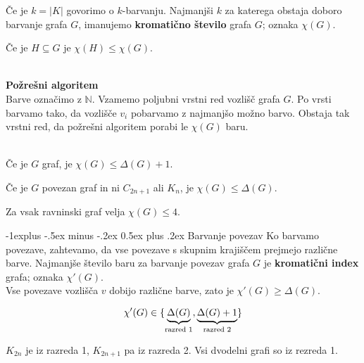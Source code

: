 \documentclass[a4paper,8pt]{extarticle}
\makeatletter
\renewcommand{\subsection}{\@startsection{subsection}{2}{0mm}%
                                {-1explus -.5ex minus -.2ex}%
                                {0.5ex plus .2ex}%
                                {\normalfont\normalsize\bfseries}}
\makeatother
\begin{document}
\begin{multicols}{4}
Če je $k = |K|$ govorimo o $k$-barvanju. Najmanjši $k$ za katerega obstaja doboro barvanje grafa $G$, imanujemo
\textbf{kromatično število} grafa $G$; oznaka $\chi(G)$.

Če je $H \subseteq G$ je $\chi(H) \leq \chi(G)$.\\\

\textbf{Požrešni algoritem}\\
Barve označimo z $\mathbb{N}$. Vzamemo poljubni vrstni red vozlišč grafa $G$. Po vrsti barvamo tako, da 
vozlišče $v_i$ pobarvamo z najmanjšo možno barvo.
Obstaja tak vrstni red, da požrešni algoritem porabi le $\chi(G)$ baru.\\\

Če je $G$ graf, je $\chi(G) \leq \Delta(G)+1$.

Če je $G$ povezan graf in ni $C_{2n+1}$ ali $K_n$, je $\chi(G) \leq \Delta(G)$.

Za vsak ravninski graf velja $\chi(G) \leq 4$.

\subsection{Barvanje povezav}
Ko barvamo povezave, zahtevamo, da vse povezave s skupnim krajiščem prejmejo različne barve.
Najmanjše število baru za barvanje povezav grafa $G$ je \textbf{kromatični index} grafa; oznaka $\chi'(G)$.\\

Vse povezave vozlišča $v$ dobijo različne barve, zato je $\chi'(G) \geq \Delta(G)$.

\[\chi'(G) \in \{\underbrace{\Delta(G)}_\textmd{razred 1}, \underbrace{\Delta(G)+1}_\textmd{razred 2} \} \]

$K_{2n}$ je iz razreda 1, $K_{2n+1}$ pa iz razreda 2. Vsi dvodelni grafi so iz rezreda 1.
\end{multicols}
\end{document}
